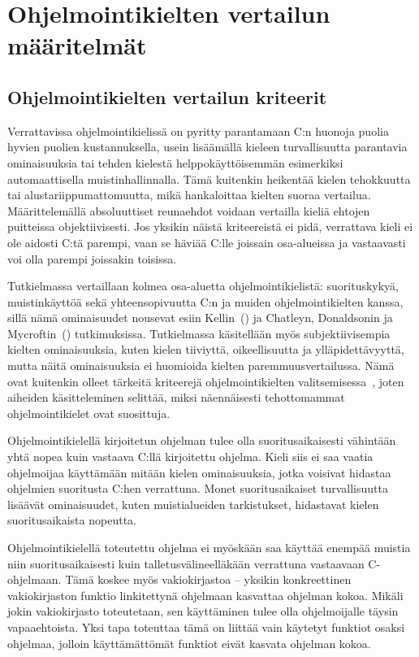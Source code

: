 \section{Ohjelmointikielten vertailun määritelmät}

\subsection{Ohjelmointikielten vertailun kriteerit}
\label{sec:abs}

Verrattavissa ohjelmointikielissä on pyritty parantamaan C:n huonoja puolia
hyvien puolien kustannuksella, usein lisäämällä kieleen turvallisuutta
parantavia ominaisuuksia tai tehden kielestä helppokäyttöisemmän esimerkiksi
automaattisella muistinhallinnalla. Tämä kuitenkin heikentää kielen tehokkuutta
tai alustariippumattomuutta, mikä hankaloittaa kielten suoraa vertailua.
Määrittelemällä absoluuttiset reunaehdot voidaan vertailla kieliä ehtojen
puitteissa objektiivisesti. Jos yksikin näistä kriteereistä ei pidä, verrattava
kieli ei ole aidosti C:tä parempi, vaan se häviää C:lle joissain osa-alueissa
ja vastaavasti voi olla parempi joissakin toisissa.

Tutkielmassa vertaillaan kolmea osa-aluetta ohjelmointikielistä: suorituskykyä,
muistinkäyttöä sekä yhteensopivuutta C:n ja muiden ohjelmointikielten kanssa,
sillä nämä ominaisuudet nousevat esiin Kellin~(\citeyear{somemeantforc}) ja
Chatleyn, Donaldsonin ja Mycroftin~(\citeyear{next7000}) tutkimuksissa.
Tutkielmassa käsitellään myös subjektiivisempia kielten ominaisuuksia, kuten
kielen tiiviyttä, oikeellisuutta ja
ylläpidettävyyttä, mutta näitä ominaisuuksia ei huomioida kielten
paremmuusvertailussa. Nämä ovat kuitenkin olleet tärkeitä kriteerejä
ohjelmointikielten valitsemisessa~\citep{empiricalpopularity}, joten aiheiden
käsitteleminen selittää, miksi näennäisesti tehottomammat ohjelmointikielet
ovat suosittuja.

\grayrule

Ohjelmointikielellä kirjoitetun ohjelman tulee olla suoritusaikaisesti
vähintään yhtä nopea kuin vastaava C:llä kirjoitettu ohjelma. Kieli siis ei saa
vaatia ohjelmoijaa käyttämään mitään kielen ominaisuuksia, jotka voisivat
hidastaa ohjelmien suoritusta C:hen verrattuna. Monet suoritusaikaiset
turvallisuutta lisäävät ominaisuudet, kuten muistialueiden tarkistukset,
hidastavat kielen suoritusaikaista nopeutta.

Ohjelmointikielellä toteutettu ohjelma ei myöskään saa käyttää enempää muistia
niin suoritusaikaisesti kuin talletusvälineelläkään verrattuna vastaavaan
C-ohjelmaan. Tämä koskee myös vakiokirjastoa --
yksikin konkreettinen vakiokirjaston funktio linkitettynä ohjelmaan kasvattaa
ohjelman kokoa. Mikäli jokin vakiokirjasto toteutetaan, sen käyttäminen tulee
olla ohjelmoijalle täysin vapaaehtoista. Yksi tapa toteuttaa tämä on liittää
vain käytetyt funktiot osaksi ohjelmaa, jolloin käyttämättömät funktiot eivät
kasvata ohjelman kokoa.

